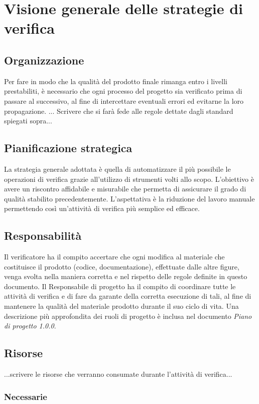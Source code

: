 \section{Visione generale delle strategie di verifica}
\subsection{Organizzazione}
Per fare in modo che la qualità del prodotto finale rimanga entro i livelli prestabiliti, è necessario che ogni processo del progetto sia verificato prima di passare al successivo, al fine di intercettare eventuali errori ed evitarne la loro propagazione. 
... Scrivere che si farà fede alle regole dettate dagli standard spiegati sopra...

\subsection{Pianificazione strategica}
La strategia generale adottata è quella di automatizzare il più possibile le operazioni di verifica grazie all'utilizzo di strumenti volti allo scopo. L'obiettivo è avere un riscontro affidabile e misurabile che permetta di assicurare il grado di qualità stabilito precedentemente.  L'aspettativa è la riduzione del lavoro manuale permettendo così un'attività di verifica più semplice ed efficace.

\subsection{Responsabilità}
Il verificatore ha il compito accertare che ogni modifica al materiale che costituisce il prodotto (codice, documentazione), effettuate dalle altre figure, venga svolta nella maniera corretta e nel rispetto delle regole definite in questo documento. Il Responsabile di progetto ha il compito di coordinare tutte le attività di verifica e di fare da garante della corretta esecuzione di tali, al fine di mantenere la qualità del materiale prodotto durante il suo ciclo di vita. Una descrizione più approfondita dei ruoli di progetto è inclusa nel documento  \textit{Piano di progetto 1.0.0}.



\subsection{Risorse}
...scrivere le risorse che verranno consumate durante l'attività di verifica...
\subsubsection{Necessarie}
